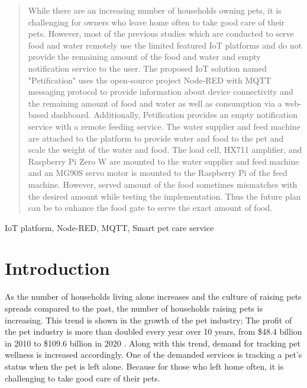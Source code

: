\documentclass[conference]{IEEEtran}
\begin{document}
\begin{abstract}
While there are an increasing number of households owning pets, it is challenging for owners who leave home often to take good care of their pets.
However, most of the previous studies which are conducted to serve food and water remotely use the limited featured IoT platforms and do not provide the remaining amount of the food and water and empty notification service to the user.
The proposed IoT solution named "Petification" uses the open-source project Node-RED with MQTT messaging protocol to provide information about device connectivity and the remaining amount of food and water as well as consumption via a web-based dashboard.
Additionally, Petification provides an empty notification service with a remote feeding service.
The water supplier and feed machine are attached to the platform to provide water and food to the pet and scale the weight of the water and food.
The load cell, HX711 amplifier, and Raspberry Pi Zero W are mounted to the water supplier and feed machine and an MG90S servo motor is mounted to the Raspberry Pi of the feed machine.
However, served amount of the food sometimes mismatches with the desired amount while testing the implementation.
Thus the future plan can be to enhance the food gate to serve the exact amount of food. \\
\end{abstract}

\begin{IEEEkeywords}
IoT platform, Node-RED, MQTT, Smart pet care service 
\end{IEEEkeywords}

\section{Introduction}
As the number of households living alone increases and the culture of raising pets spreads compared to the past, the number of households raising pets is increasing.
This trend is shown in the growth of the pet industry; The profit of the pet industry is more than doubled every year over 10 years, from \$48.4 billion in 2010 to \$109.6 billion in 2020 \cite{b1}.
Along with this trend, demand for tracking pet wellness is increased accordingly.
One of the demanded services is tracking a pet’s status when the pet is left alone.
Because for those who left home often, it is challenging to take good care of their pets.
\end{document}
